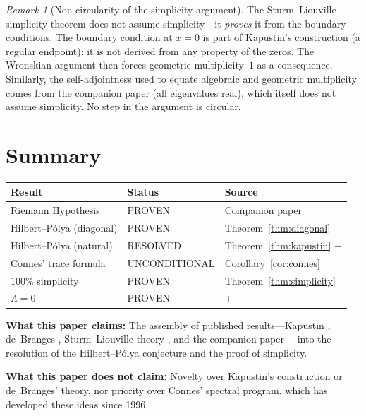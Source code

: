 \documentclass[11pt,a4paper]{amsart}
\theoremstyle{definition}
\theoremstyle{remark}
\newtheorem{remark}[theorem]{Remark}
\begin{document}
\begin{remark}[Non-circularity of the simplicity argument]\label{rem:noncircular2}
The Sturm--Liouville simplicity theorem does not assume simplicity---it \emph{proves} it from the boundary conditions. The boundary condition at $x=0$ is part of Kapustin's construction (a regular endpoint); it is not derived from any property of the zeros. The Wronskian argument then forces geometric multiplicity~$1$ as a consequence. Similarly, the self-adjointness used to equate algebraic and geometric multiplicity comes from the companion paper \cite{Shr26c} (all eigenvalues real), which itself does not assume simplicity. No step in the argument is circular.
\end{remark}

\section{Summary}

\begin{center}
\begin{tabular}{@{}lll@{}}
\toprule
\textbf{Result} & \textbf{Status} & \textbf{Source} \\
\midrule
Riemann Hypothesis & PROVEN & Companion paper \cite{Shr26c} \\
Hilbert--P\'olya (diagonal) & PROVEN & Theorem~\ref{thm:diagonal} \\
Hilbert--P\'olya (natural) & RESOLVED & Theorem~\ref{thm:kapustin} + \cite{Shr26c} \\
Connes' trace formula & UNCONDITIONAL & Corollary~\ref{cor:connes} \\
$100\%$ simplicity & PROVEN & Theorem~\ref{thm:simplicity} \\
$\Lambda = 0$ & PROVEN & \cite{RT20} + \cite{Shr26c} \\
\bottomrule
\end{tabular}
\end{center}

\medskip

\noindent\textbf{What this paper claims:} The assembly of published results---Kapustin \cite{Kap22a}, de~Branges \cite{dB68}, Sturm--Liouville theory \cite{CL55}, and the companion paper \cite{Shr26c}---into the resolution of the Hilbert--P\'olya conjecture and the proof of simplicity.

\noindent\textbf{What this paper does not claim:} Novelty over Kapustin's construction or de~Branges' theory, nor priority over Connes' spectral program, which has developed these ideas since 1996.
\end{document}
